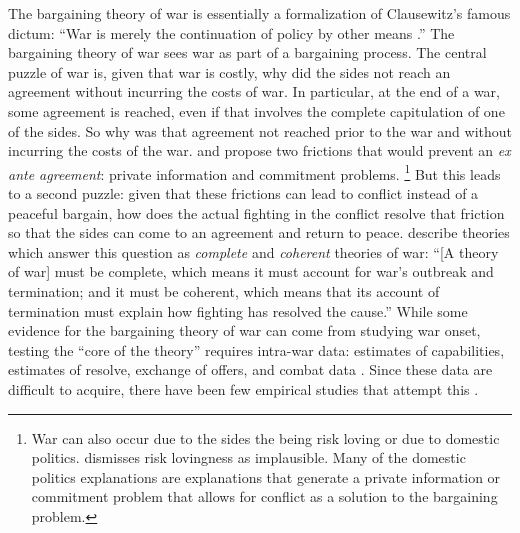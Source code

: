 The bargaining theory of war is essentially a formalization of Clausewitz's famous dictum: ``War is merely the continuation of policy by other means \parencite[87]{Clausewitz1989}.''
The bargaining theory of war sees war as part of a bargaining process.
The central puzzle of war is, given that war is costly, why did the sides not reach an agreement without incurring the costs of war.
In particular, at the end of a war, some agreement is reached, even if that involves the complete capitulation of one of the sides.
So why was that agreement not reached prior to the war and without incurring the costs of the war.
\textcite{Fearon1995} and \textcite{Powell2006} propose two frictions that would prevent an \textit{ex ante agreement}: private information and commitment problems.%
\footnote{
  War can also occur due to the sides the being risk loving or due to domestic politics.
  \textcite{Fearon1995} dismisses risk lovingness as implausible.
  Many of the domestic politics explanations are explanations that generate a private information or commitment problem that allows for conflict as a solution to the bargaining problem.
}
But this leads to a second puzzle: given that these frictions can lead to conflict instead of a peaceful bargain, how does the actual fighting in the conflict resolve that friction so that the sides can come to an agreement and return to peace.
\textcite[757]{LeventogluSlantchev2007} describe theories which answer this question as \textit{complete} and \textit{coherent} theories of war: ``[A theory of war] must be complete, which means it must account for war’s outbreak and termination; and it must be coherent, which means that its account of termination must explain how fighting has resolved the cause.''
While some evidence for the bargaining theory of war can come from studying war onset, testing the ``core of the theory'' requires intra-war data: estimates of capabilities, estimates of resolve, exchange of offers, and combat data \parencite{Reiter2003}.
Since these data are difficult to acquire, there have been few empirical studies that attempt this \parencites{Reiter2003}{Ramsay2008}{Reiter2009}{Weisiger2015}.

